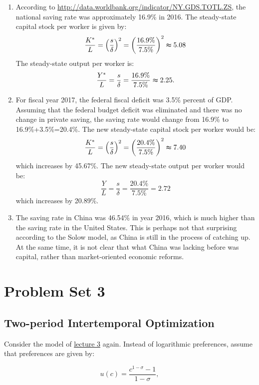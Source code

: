 \documentclass[]{book}
\theoremstyle{definition}
\theoremstyle{definition}
\theoremstyle{definition}
\theoremstyle{remark}
\begin{document}
\begin{enumerate}
\def\labelenumi{\arabic{enumi}.}
\item
  According to \url{http://data.worldbank.org/indicator/NY.GDS.TOTL.ZS},
  the national saving rate was approximately 16.9\% in 2016. The
  steady-state capital stock per worker is given by:
  \[\frac{K^{*}}{L}=\left(\frac{s}{\delta}\right)^{2}=\left(\frac{16.9\%}{7.5\%}\right)^{2}\thickapprox5.08\]
  The steady-state output per worker is:
  \[\frac{Y^{*}}{L}=\frac{s}{\delta}=\frac{16.9\%}{7.5\%}\thickapprox2.25.\]
\item
  For fiscal year 2017, the federal fiscal deficit was 3.5\% percent of
  GDP. Assuming that the federal budget deficit was eliminated and there
  was no change in private saving, the saving rate would change from
  16.9\% to 16.9\%+3.5\%=20.4\%. The new steady-state capital stock per
  worker would be:
  \[\frac{K^{*}}{L}=\left(\frac{s}{\delta}\right)^{2}=\left(\frac{20.4\%}{7.5\%}\right)^{2}\thickapprox7.40\]
  which increases by 45.67\%. The new steady-state output per worker
  would be: \[\frac{Y}{L}=\frac{s}{\delta}=\frac{20.4\%}{7.5\%}=2.72\]
  which increases by 20.89\%.
\item
  The saving rate in China was 46.54\% in year 2016, which is much
  higher than the saving rate in the United States. This is perhaps not
  that surprising according to the Solow model, as China is still in the
  process of catching up. At the same time, it is not clear that what
  China was lacking before was capital, rather than market-oriented
  economic reforms.
\end{enumerate}

\chapter{Problem Set 3}\label{pset3}

\section{Two-period Intertemporal
Optimization}\label{two-period-intertemporal-optimization}

Consider the model of \protect\hyperlink{two-period}{lecture 3} again.
Instead of logarithmic preferences, assume that preferences are given
by:

\[u(c) = \frac{c^{1-\sigma}-1}{1-\sigma},\]
\end{document}
